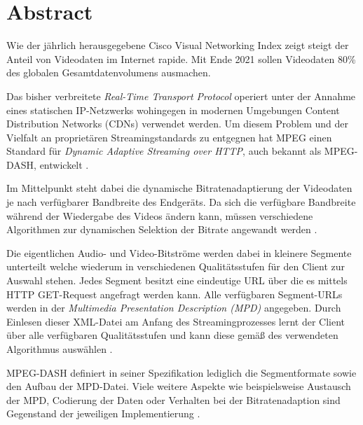 \documentclass[paper = a4, fontsize = 12pt, parskip = half]{scrartcl} %
\begin{document}





\setcounter{page}{1}
\onehalfspacing

\section*{Abstract}
Wie der jährlich herausgegebene Cisco Visual Networking Index \cite{cisco_syst_inc_cisco_2017} zeigt steigt der Anteil von Videodaten im Internet rapide. Mit Ende 2021 sollen Videodaten 80\% des globalen Gesamtdatenvolumens ausmachen. \cite{cisco_syst_inc_cisco_2017}

Das bisher verbreitete \textit{Real-Time Transport Protocol} operiert unter der Annahme eines statischen IP-Netzwerks wohingegen in modernen Umgebungen Content Distribution Networks (CDNs) verwendet werden. Um diesem Problem und der Vielfalt an proprietären Streamingstandards zu entgegnen hat MPEG einen Standard für \textit{Dynamic Adaptive Streaming over HTTP}, auch bekannt als MPEG-DASH, entwickelt \cite{sodagar_mpeg-dash_2011}.

Im Mittelpunkt steht dabei die dynamische Bitratenadaptierung der Videodaten je nach verfügbarer Bandbreite des Endgeräts. Da sich die verfügbare Bandbreite während der Wiedergabe des Videos ändern kann, müssen verschiedene Algorithmen zur dynamischen Selektion der Bitrate angewandt werden \cite{bentaleb_survey_2019}.

Die eigentlichen Audio- und Video-Bitströme werden dabei in kleinere Segmente unterteilt welche wiederum in verschiedenen Qualitätsstufen für den Client zur Auswahl stehen. Jedes Segment besitzt eine eindeutige URL über die es mittels HTTP GET-Request angefragt werden kann. Alle verfügbaren Segment-URLs werden in der \textit{Multimedia Presentation Description (MPD)} angegeben. Durch Einlesen dieser XML-Datei am Anfang des Streamingprozesses lernt der Client über alle verfügbaren Qualitätsstufen und kann diese gemäß des verwendeten Algorithmus auswählen \cite{sodagar_mpeg-dash_2011}.

MPEG-DASH definiert in seiner Spezifikation lediglich die Segmentformate sowie den Aufbau der MPD-Datei. Viele weitere Aspekte wie beispielsweise Austausch der MPD, Codierung der Daten oder Verhalten bei der Bitratenadaption sind Gegenstand der jeweiligen Implementierung \cite{sodagar_mpeg-dash_2011}.



\printbibliography
\end{document}
